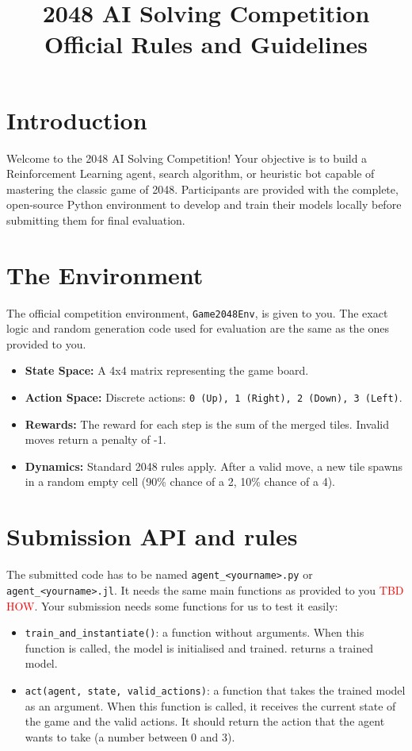 \documentclass[11pt]{article}
\title{\vspace{-2cm}\textbf{\Huge 2048 AI Solving Competition}\\ \vspace{0.5cm} \Large Official Rules and Guidelines}
\author{}
\date{}
\begin{document}
\maketitle

\section{Introduction}
Welcome to the 2048 AI Solving Competition! Your objective is to build a Reinforcement Learning agent, search algorithm, or heuristic bot capable of mastering the classic game of 2048. Participants are provided with the complete, open-source Python environment to develop and train their models locally before submitting them for final evaluation.

\section{The Environment}
The official competition environment, \texttt{Game2048Env}, is given to you. The exact logic and random generation code used for evaluation are the same as the ones provided to you.
\begin{itemize}
    \item \textbf{State Space:} A 4x4 matrix representing the game board.
    \item \textbf{Action Space:} Discrete actions: \texttt{0 (Up), 1 (Right), 2 (Down), 3 (Left)}.
    \item \textbf{Rewards:} The reward for each step is the sum of the merged tiles. Invalid moves return a penalty of -1.
    \item \textbf{Dynamics:} Standard 2048 rules apply. After a valid move, a new tile spawns in a random empty cell (90\% chance of a 2, 10\% chance of a 4).
\end{itemize}

\section{Submission API and rules}
The submitted code has to be named \lstinline|agent_<yourname>.py| or \lstinline|agent_<yourname>.jl|. It needs the same main functions as provided to you \textcolor{red}{TBD HOW}.
Your submission needs some functions for us to test it easily:
\begin{itemize}
    \item \lstinline|train_and_instantiate()|: a function without arguments. When this function is called, the model is initialised and trained. returns a trained model.
    \item \lstinline|act(agent, state, valid_actions)|: a function that takes the trained model as an argument. When this function is called, it receives the current state of the game and the valid actions. It should return the action that the agent wants to take (a number between 0 and 3).
\end{itemize}
\end{document}
